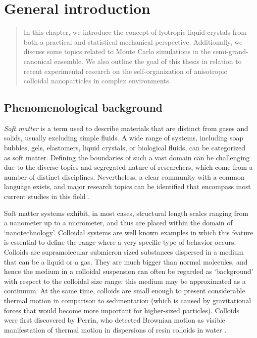 
\chapter{General introduction}
\label{introduction}

\begin{abstract}
In this chapter, we introduce the concept of lyotropic liquid crystals from both a practical and statistical mechanical perspective. Additionally, we discuss some topics related to Monte Carlo simulations in the semi-grand-canonical ensemble. We also outline the goal of this thesis in relation to recent experimental research on the self-organization of anisotropic colloidal nanoparticles in complex environments.

\end{abstract}


\section{Phenomenological background}

{\em Soft matter} is a term used to describe materials that are distinct from gases and solids, usually excluding simple fluids. A wide range of systems, including soap bubbles, gels, elastomers, liquid crystals, or biological fluids, can be categorized as soft matter. Defining the boundaries of such a vast domain can be challenging due to the diverse topics and segregated nature of researchers, which come from a number of distinct disciplines. Nevertheless, a clear community with a common language exists, and major research topics can be identified that encompass most current studies in this field \cite{borsali2018soft}.

Soft matter systems exhibit, in most cases, structural length scales ranging from a nanometer up to a micrometer, and thus are placed within the domain of ‘nanotechnology’. Colloidal systems are well known examples in which this feature is essential to define the range where a very specific type of behavior occurs. Colloids are supramolecular submicron sized substances dispersed in a medium that can be a liquid or a gas. They are much bigger than normal molecules, and hence the medium in a colloidal suspension can often be regarded as ‘background’ with respect to the colloidal size range: this medium may be approximated as a continuum. At the same time, colloids are small enough to present considerable thermal motion in comparison to sedimentation (which is caused by gravitational forces that would become more important for higher-sized particles). Colloids were first discovered by Perrin, who detected Brownian motion as visible manifestation of thermal motion in dispersions of resin colloids in water \cite{perrin1913atomes}.

